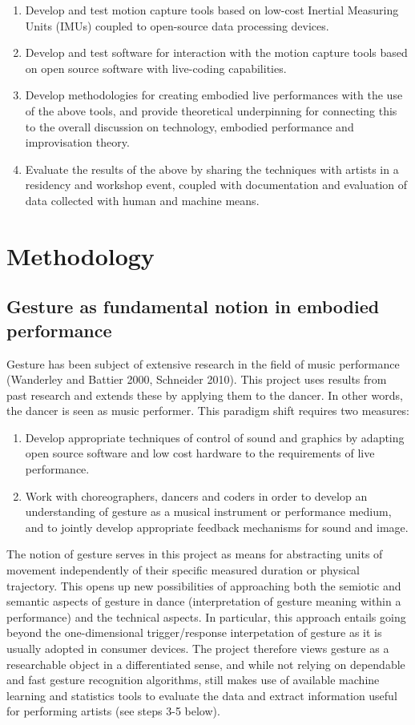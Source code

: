 \begin{enumerate}
\item Develop and test motion capture tools based on low-cost Inertial Measuring Units (IMUs) coupled to open-source data processing devices.
\item Develop and test software for interaction with the motion capture tools based on open source software with live-coding capabilities.
\item Develop methodologies for creating embodied live performances with the use of the above tools, and provide theoretical underpinning for connecting this to the overall discussion on technology, embodied performance and improvisation theory.
\item Evaluate the results of the above by sharing the techniques with artists in a residency and workshop event, coupled with documentation and evaluation of data collected with human and machine means.
\end{enumerate}

\section{Methodology}
\label{sec:org6f96dbd}
\subsection{Gesture as fundamental notion in embodied performance}
\label{sec:orgedb70d9}
Gesture has been subject of extensive research in the field of music performance (Wanderley and Battier 2000, Schneider 2010).  This project uses results from past research and extends these by applying them to the dancer.  In other words, the dancer is seen as music performer.  This paradigm shift requires two measures:

\begin{enumerate}
\item Develop appropriate techniques of control of sound and graphics by adapting open source software and low cost hardware to the requirements of live performance.
\item Work with choreographers, dancers and coders in order to develop an understanding of gesture as a musical instrument or performance medium, and to jointly develop appropriate feedback mechanisms for sound and image.
\end{enumerate}

The notion of gesture serves in this project as means for abstracting units of movement independently of their specific measured duration or physical trajectory.  This opens up new possibilities of approaching both the semiotic and semantic aspects of gesture in dance (interpretation of gesture meaning within a performance) and the technical aspects.  In particular, this approach entails going beyond the one-dimensional trigger/response interpetation of gesture as it is usually adopted in consumer devices. The project therefore views gesture as a researchable object in a differentiated sense, and while not relying on dependable and fast gesture recognition algorithms, still makes use of available machine learning and statistics tools to evaluate the data and extract information useful for performing artists (see steps 3-5 below).

